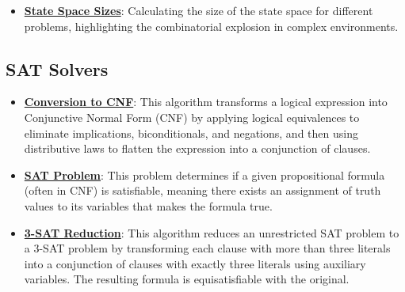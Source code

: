 \documentclass{article}%
\begin{document}
\begin{itemize}[leftmargin=*]
\item \href{https://purdue.brightspace.com/d2l/common/assets/pdfjs-d2l-dist/1.0.14-legacy/web/viewer.html?file=\%2Fcontent\%2Fenforced\%2F1095467-wl.202510.CS.24300.001\%2F14L1-DepthFS.pdf\%3Fou\%3D1095467\&lang=en-us\&container=d2l-fileviewer-rendered-pdf\&fullscreen=d2l-fileviewer-rendered-pdf-dialog\&height=667#page=38}{\textbf{State Space Sizes}}: Calculating the size of the state space for different problems, highlighting the combinatorial explosion in complex environments.%
\end{itemize}

%
\subsection{SAT Solvers}%
\label{subsec:SATSolvers}%
\begin{itemize}[leftmargin=*]%
\item \href{https://purdue.brightspace.com/d2l/common/assets/pdfjs-d2l-dist/1.0.14-legacy/web/viewer.html?file=\%2Fcontent\%2Fenforced\%2F1095467-wl.202510.CS.24300.001\%2F13L1-Logic.pdf\%3Fou\%3D1095467\&lang=en-us\&container=d2l-fileviewer-rendered-pdf\&fullscreen=d2l-fileviewer-rendered-pdf-dialog\&height=667#page=17}{\textbf{Conversion to CNF}}: This algorithm transforms a logical expression into Conjunctive Normal Form (CNF) by applying logical equivalences to eliminate implications, biconditionals, and negations, and then using distributive laws to flatten the expression into a conjunction of clauses.%
\item \href{https://purdue.brightspace.com/d2l/common/assets/pdfjs-d2l-dist/1.0.14-legacy/web/viewer.html?file=\%2Fcontent\%2Fenforced\%2F1095467-wl.202510.CS.24300.001\%2F13L1-Logic.pdf\%3Fou\%3D1095467\&lang=en-us\&container=d2l-fileviewer-rendered-pdf\&fullscreen=d2l-fileviewer-rendered-pdf-dialog\&height=667#page=15}{\textbf{SAT Problem}}: This problem determines if a given propositional formula (often in CNF) is satisfiable, meaning there exists an assignment of truth values to its variables that makes the formula true.%
\item \href{https://purdue.brightspace.com/d2l/common/assets/pdfjs-d2l-dist/1.0.14-legacy/web/viewer.html?file=\%2Fcontent\%2Fenforced\%2F1095467-wl.202510.CS.24300.001\%2F13L1-Logic.pdf\%3Fou\%3D1095467\&lang=en-us\&container=d2l-fileviewer-rendered-pdf\&fullscreen=d2l-fileviewer-rendered-pdf-dialog\&height=667#page=24}{\textbf{3-SAT Reduction}}: This algorithm reduces an unrestricted SAT problem to a 3-SAT problem by transforming each clause with more than three literals into a conjunction of clauses with exactly three literals using auxiliary variables. The resulting formula is equisatisfiable with the original.%

\end{itemize}
\end{document}
